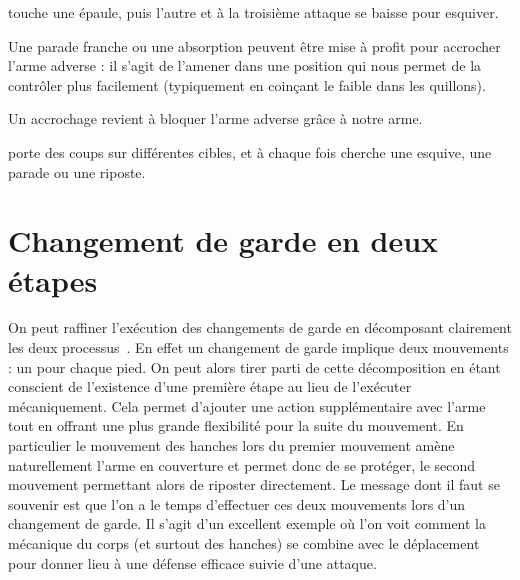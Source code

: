 \begin{exercice}
\A touche une épaule, puis l'autre et à la troisième attaque \D se baisse pour esquiver.
\end{exercice}


Une parade franche ou une absorption peuvent être mise à profit pour accrocher l'arme adverse : il s'agit de l'amener dans une position qui nous permet de la contrôler plus facilement (typiquement en coinçant le faible dans les quillons).


\begin{definition}[Accrochage]

Un accrochage revient à bloquer l'arme adverse grâce à notre arme.
\end{definition}


\begin{exercice}
\A porte des coups sur différentes cibles, et à chaque fois \D cherche une esquive, une parade ou une riposte.
\end{exercice}



\section{Changement de garde en deux étapes}


\label{def:texte:garde-kung-fu}
On peut raffiner l'exécution des changements de garde en décomposant clairement les deux processus~\footnotemark{}.
En effet un changement de garde implique deux mouvements : un pour chaque pied.
On peut alors tirer parti de cette décomposition en étant conscient de l'existence d'une première étape au lieu de l'exécuter mécaniquement.
Cela permet d'ajouter une action supplémentaire avec l'arme tout en offrant une plus grande flexibilité pour la suite du mouvement.
En particulier le mouvement des hanches lors du premier mouvement amène naturellement l'arme en couverture et permet donc de se protéger, le second mouvement permettant alors de riposter directement.
Le message dont il faut se souvenir est que l'on a le temps d'effectuer ces deux mouvements lors d'un changement de garde.
Il s'agit d'un excellent exemple où l'on voit comment la mécanique du corps (et surtout des hanches) se combine avec le déplacement pour donner lieu à une défense efficace suivie d'une attaque.

